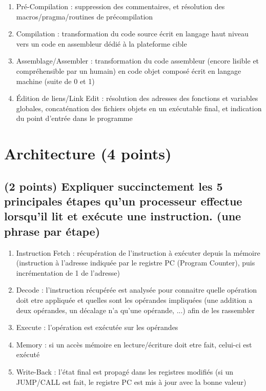 \documentclass[11pt,a4paper]{article}
\begin{document}
\bigskip
\begin{enumerate}
\item Pré-Compilation : suppression des commentaires, et résolution des macros/pragma/routines de précompilation
\item Compilation : transformation du code source écrit en langage haut niveau vers un code en assembleur dédié à la plateforme cible
\item Assemblage/Assembler : transformation du code assembleur (encore lisible et compréhensible par un humain) en code objet composé écrit en langage machine (suite de 0 et 1)
\item \'Edition de liens/Link Edit : résolution des adresses des fonctions et variables globales, concaténation des fichiers objets en un exécutable final, et indication du point d'entrée dans le programme
\end{enumerate}
\bigskip

\section{Architecture (4 points)} %

\subsection{(2 points) Expliquer succinctement les 5 principales étapes qu'un processeur effectue lorsqu'il lit et exécute une instruction. (une phrase par étape)}

\bigskip
\begin{enumerate}
\item Instruction Fetch : récupération de l'instruction à exécuter depuis la mémoire (instruction à l'adresse indiquée par le registre PC (Program Counter), puis incrémentation de 1 de l'adresse)
\item Decode : l'instruction récupérée est analysée pour connaitre quelle opération doit etre appliquée et quelles sont les opérandes impliquées (une addition a deux opérandes, un décalage n'a qu'une opérande, ...) afin de les rassembler
\item Execute : l'opération est exécutée sur les opérandes
\item Memory : si un accès mémoire en lecture/écriture doit etre fait, celui-ci est exécuté
\item Write-Back : l'état final est propagé dans les registres modifiés (si un JUMP/CALL est fait, le registre PC est mis à jour avec la bonne valeur)
\end{enumerate}
\bigskip
\end{document}
